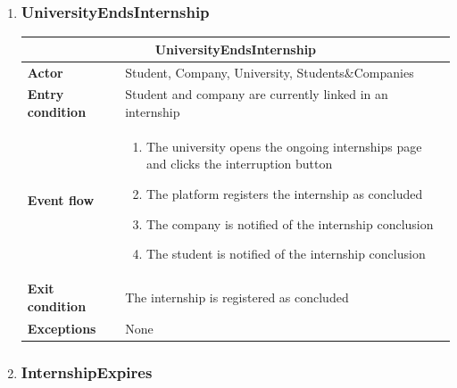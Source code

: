 \begin{enumerate}[label=\textbf{UC\arabic* -}]
\item \subsubsection{UniversityEndsInternship}

\begin{table}[H]
    \centering
    \begin{tabular}{|l|m{10cm}|}
        \hline \multicolumn{2}{|c|}{\textbf{UniversityEndsInternship}} \\
        \hline \textbf{Actor} & Student, Company, University, Students\&Companies \\
        \hline \textbf{Entry condition} & Student and company are currently linked in an internship \\
        \hline \textbf{Event flow} &
            \begin{enumerate}[label=\arabic*]
                \item The university opens the ongoing internships page and clicks the interruption button
                \item The platform registers the internship as concluded
                \item The company is notified of the internship conclusion
                \item The student is notified of the internship conclusion
            \end{enumerate} \\
        \hline \textbf{Exit condition} & The internship is registered as concluded \\
        \hline \textbf{Exceptions} & None \\
        \hline
    \end{tabular}
\end{table}

\item \subsubsection{InternshipExpires}


\end{enumerate}

